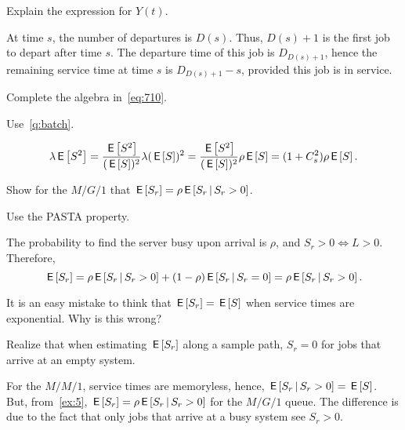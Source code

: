 \begin{exercise}\label{ex:13}
Explain the expression for $Y(t)$.
\begin{solution}
 At time $s$, the number of departures is $D(s)$.
 Thus, $D(s)+1$ is the first job to depart after time $s$.
 The departure time of this job is $D_{D(s)+1}$, hence the remaining service time at time $s$ is $D_{D(s)+1}-s$, provided this job is in service.
\end{solution}
\end{exercise}


\begin{exercise}\label{ex:65}
Complete the algebra in~\cref{eq:710}.
\begin{hint}
  Use~\cref{q:batch}.
\end{hint}
\begin{solution}
\begin{equation*}
 \lambda\,\mathsf{E}\left[S^2\right] = \frac{\,\mathsf{E}\left[S^2\right]}{(\,\mathsf{E}\left[S\right])^2} \lambda(\,\mathsf{E}\left[S\right])^2=
 \frac{\,\mathsf{E}\left[S^2\right]}{(\,\mathsf{E}\left[S\right])^2} \rho \,\mathsf{E}\left[S\right] = (1+C_s^2) \rho \,\mathsf{E}\left[S\right].
\end{equation*}
\end{solution}
\end{exercise}




\begin{exercise}\label{ex:5}
Show for the $M/G/1$ that $\,\mathsf{E}\left[S_r\right] = \rho \,\mathsf{E}\left[S_r\,\middle|\, S_r>0\right]$.
\begin{hint}
Use the PASTA property.%
\end{hint}
\begin{solution}
 The probability to find the server busy upon arrival is $\rho$, and $S_r>0 \iff L>0$. Therefore,
\begin{equation*}
\,\mathsf{E}\left[S_r\right] = \rho \,\mathsf{E}\left[S_r\,\middle|\, S_r >0\right] + (1-\rho) \,\mathsf{E}\left[S_r\,\middle|\, S_r = 0\right] = \rho \,\mathsf{E}\left[S_r\,\middle|\, S_r>0\right].
\end{equation*}
\end{solution}
\end{exercise}

\begin{exercise}
 It is an easy mistake to think that $\,\mathsf{E}\left[S_r\right] = \,\mathsf{E}\left[S\right]$ when service
 times are exponential. Why is this wrong?
\begin{hint}
  Realize that when estimating $\,\mathsf{E}\left[S_r\right]$ along a sample path, $S_r=0$ for jobs that arrive at an empty system.
\end{hint}
\begin{solution}
  For the $M/M/1$, service times are memoryless, hence, $\,\mathsf{E}\left[S_r \,\middle|\, S_r>0\right] = \,\mathsf{E}\left[S\right]$.
  But, from~\cref{ex:5}, $\,\mathsf{E}\left[S_r\right] = \rho \,\mathsf{E}\left[S_r \,\middle|\, S_r>0\right]$ for the $M/G/1$ queue.
  The difference is due to the fact that only jobs that arrive at  a busy system see $S_r>0$.
\end{solution}
\end{exercise}




